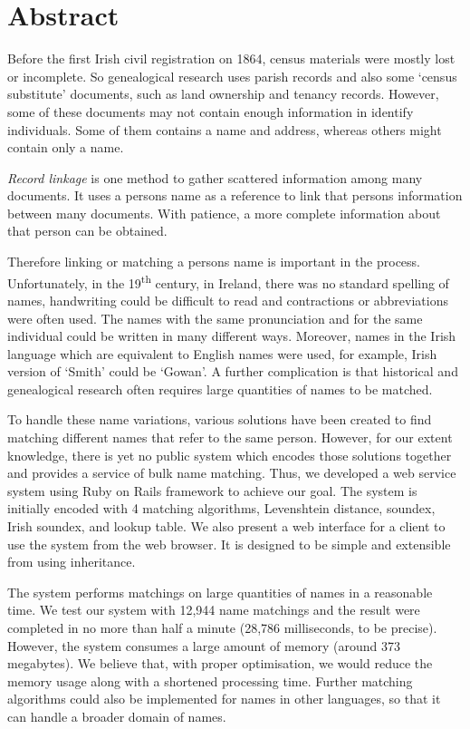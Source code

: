 

\begingroup
\let\clearpage\relax
\let\cleardoublepage\relax
\let\cleardoublepage\relax

\chapter*{Abstract}

Before the first Irish civil registration on 1864, census materials
were mostly lost or incomplete. So genealogical research uses
parish records and also some `census substitute' documents,
such as land ownership and tenancy records. However, some of these documents
may not contain enough information in identify individuals.
Some of them contains a name and address,
whereas others might contain only a name.

\emph{Record linkage} is one method to gather scattered information among many documents.
It uses a person\textquotesingle s name as a reference to link that
person\textquotesingle s information between many documents. With patience,
a more complete information about that person can be obtained.

Therefore linking or matching a person\textquotesingle s name is important in the process.
Unfortunately, in the 19\textsuperscript{th} century, in Ireland, there was no standard
spelling of names, handwriting could be difficult to read
and contractions or abbreviations were often used. The names with the same
pronunciation and for the same individual could be written in many different ways.
Moreover, names in the Irish language which are equivalent to English names
were used, for example, Irish version of `Smith' could be `Gowan'.
A further complication is that historical  and genealogical research often
requires large quantities of names to be matched.

To handle these name variations, various solutions have been created to find
matching different names that refer to the same person. However,
for our extent knowledge, there is yet no public system which encodes
those solutions together and provides a service of bulk name matching.
Thus, we developed a web service system using Ruby on Rails framework
to achieve our goal. The system is initially encoded with 4 matching algorithms,
Levenshtein distance, soundex, Irish soundex, and lookup table.
We also present a web interface for a client to use the system
from the web browser. It is designed to be simple and extensible from using
inheritance.

The system performs matchings on large quantities of names in a reasonable time.
We test our system with 12,944 name matchings and the result were completed
in no more than half a minute (28,786 milliseconds, to be precise).
However, the system consumes a large amount of memory (around 373 megabytes).
We believe that, with proper optimisation, we would reduce the memory usage
along with a shortened processing time. Further matching algorithms could also
be implemented for names in other languages, so that it can handle
a broader domain of names.

\endgroup
\vfill
